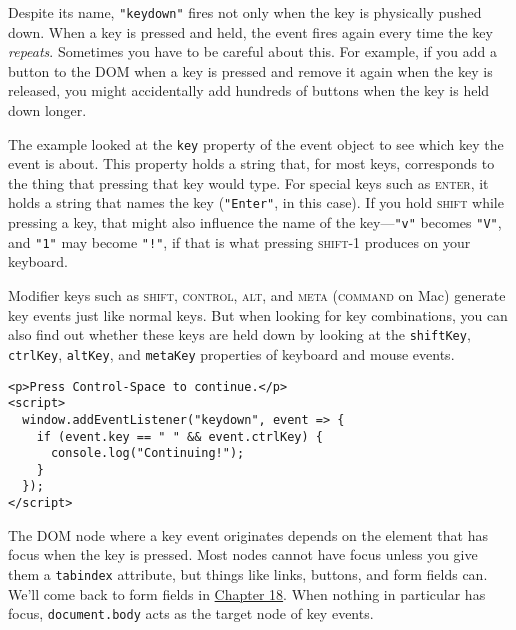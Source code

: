 Despite its name, \lstinline`"keydown"` fires not only when the key is physically pushed down. When a key is pressed and held, the event fires again every time the key \emph{repeats}. Sometimes you have to be careful about this. For example, if you add a button to the DOM when a key is pressed and remove it again when the key is released, you might accidentally add hundreds of buttons when the key is held down longer.

The example looked at the \lstinline`key` property of the event object to see which key the event is about. This property holds a string that, for most keys, corresponds to the thing that pressing that key would type. For special keys such as \textsc{enter}, it holds a string that names the key (\lstinline`"Enter"`, in this case). If you hold \textsc{shift} while pressing a key, that might also influence the name of the key—\lstinline`"v"` becomes \lstinline`"V"`, and \lstinline`"1"` may become \lstinline`"!"`, if that is what pressing \textsc{shift}-1 produces on your keyboard.

Modifier keys such as \textsc{shift}, \textsc{control}, \textsc{alt}, and \textsc{meta} (\textsc{command} on Mac) generate key events just like normal keys. But when looking for key combinations, you can also find out whether these keys are held down by looking at the \lstinline`shiftKey`, \lstinline`ctrlKey`, \lstinline`altKey`, and \lstinline`metaKey` properties of keyboard and mouse events.

\begin{lstlisting}
<p>Press Control-Space to continue.</p>
<script>
  window.addEventListener("keydown", event => {
    if (event.key == " " && event.ctrlKey) {
      console.log("Continuing!");
    }
  });
</script>
\end{lstlisting}
\noindent{}

The DOM node where a key event originates depends on the element that has focus when the key is pressed. Most nodes cannot have focus unless you give them a \lstinline`tabindex` attribute, but things like links, buttons, and form fields can. We'll come back to form fields in \hyperref[http.forms]{Chapter 18}. When nothing in particular has focus, \lstinline`document.body` acts as the target node of key events.

